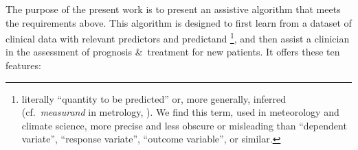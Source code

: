 \documentclass[utf8]{FrontiersinHarvard} %
\newcommand*{\amp}{\&}
\newcommand*{\cf}{{cf.}}
\renewcommand*{\|}[1][]{\nonscript\:#1\vert\nonscript\:\mathopen{}}
\begin{document}
\medskip

The purpose of the present work is to present an assistive algorithm that meets the requirements above. This algorithm is designed to first learn from a dataset of clinical data with relevant predictors and predictand%
%
%
\footnote{literally \enquote{quantity to be predicted} or, more generally, inferred (\cf\ \emph{measurand} in metrology, \citealt[2.3]{jcgm1997_r2012}). We find this term, used in meteorology and climate science, more precise and less obscure or misleading than \enquote{dependent variate}, \enquote{response variate}, \enquote{outcome variable}, or similar.}, and then assist a clinician in the assessment of prognosis \amp\ treatment for new patients. It offers these ten features:
\end{document}
